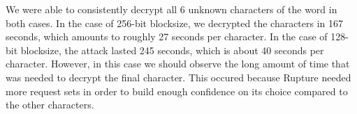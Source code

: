 We were able to consistently decrypt all 6 unknown characters of the word in
both cases. In the case of 256-bit blocksize, we decrypted the characters in
167 seconds, which amounts to roughly 27 seconds per character. In the case of
128-bit blocksize, the attack lasted 245 seconds, which is about 40 seconds per
character. However, in this case we should observe the long amount of time that
was needed to decrypt the final character. This occured because Rupture needed
more request sets in order to build enough confidence on its choice compared to
the other characters.
